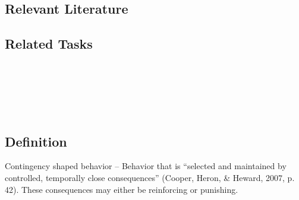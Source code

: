 \subsection{Relevant Literature}
\begin{refsection}
\nocite{test,alang2017police,clayton2018black}
\printbibliography[heading=none]
\end{refsection}
%
\subsection{Related Tasks}
\fouraFourteen{}\\
\fourbThree{}\\
\foureEight{}\\
\fourgFour{}\\
%
%
%
%
%
%
%
\section{\fourFKFourtyOne{}}
\subsection{Definition}
Contingency shaped behavior – Behavior that is ``selected and maintained by controlled, temporally close consequences'' (Cooper, Heron, \& Heward, 2007, p. 42).  These consequences may either be reinforcing or punishing.  
%
